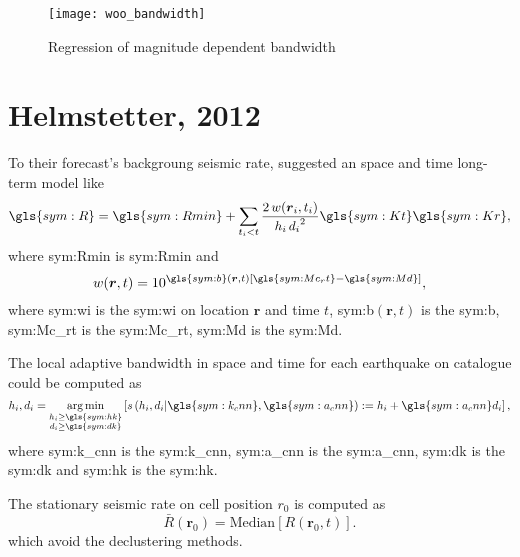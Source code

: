 \documentclass[final]{beamer}
\DeclareMathOperator*{\argmin}{arg\,min}
\begin{document}
\begin{poster}
\begin{figure}[H]
  \centering
  \texttt{[image: woo\_bandwidth]} 
  \caption{Regression of magnitude dependent bandwidth}
  \label{fig:woo_b} 
\end{figure}


\section{Helmstetter, 2012}
\footnotesize
	To their forecast's backgroung seismic rate, \citet{helmstetter_2012} suggested
	an space and time long-term model like 
		\begin{equation}
		\ensuremath{\gls{sym:R} = \gls{sym:Rmin} + \sum_{t_i < t}{ 
			\frac{2\,w(\boldsymbol{r}_i,t_i)}{h_i\,{d_i}^2}
					\gls{sym:Kt}\gls{sym:Kr} }},
			\label{eq:helms02}
		\end{equation}
\footnotesize
	where \gls{sym:Rmin} is \glsdesc{sym:Rmin} and
\small
		\begin{equation}
			\ensuremath{ w(\boldsymbol{r},t) = 10^{ \gls{sym:b}(\boldsymbol{r},t) \left[ \gls{sym:Mc_rt} - \gls{sym:Md}
			\right] } },
			\label{eq:helms_wi}
		\end{equation}
\footnotesize
	where \gls{sym:wi} is the \glsdesc{sym:wi} on location $\boldsymbol{r}$ and
	time $t$, \gls{sym:b}$(\boldsymbol{r},t)$ is the \glsdesc{sym:b}, 
		  \gls{sym:Mc_rt} is the \glsdesc{sym:Mc_rt}, 
		  \gls{sym:Md} is the \glsdesc{sym:Md}.

The \alert{local adaptive bandwidth} in space and time for each earthquake on
catalogue could be computed as
\small
		\begin{equation}
			\ensuremath{
				h_i, d_i = \argmin_{\substack{h_i \ge \gls{sym:hk} \\
								              d_i \ge \gls{sym:dk}}
						           } 
				\left[ s \left(h_i,d_i 
					 		  \arrowvert
							  \gls{sym:k_cnn},\gls{sym:a_cnn}
					     \right) 
					   := h_i + \gls{sym:a_cnn}d_i 
			    \right],
			}
			\label{eq:helms_cnn}
		\end{equation}
\footnotesize
	where \gls{sym:k_cnn} is the \glsdesc{sym:k_cnn},
		 \gls{sym:a_cnn} is the \glsdesc{sym:a_cnn},
		 \gls{sym:dk} is the \glsdesc{sym:dk} and 
		 \gls{sym:hk} is the \glsdesc{sym:hk}.


The stationary seismic rate on cell position $r_0$ is computed as 
\footnotesize
		\begin{equation}
			\ensuremath{
				\bar{R}(\boldsymbol{r}_0) = \text{Median}\left[R(\boldsymbol{r}_0, t)\right].
			}
			\label{eq:helms_mediana}
		\end{equation}
which avoid the declustering methods.


\end{poster}
\end{document}
